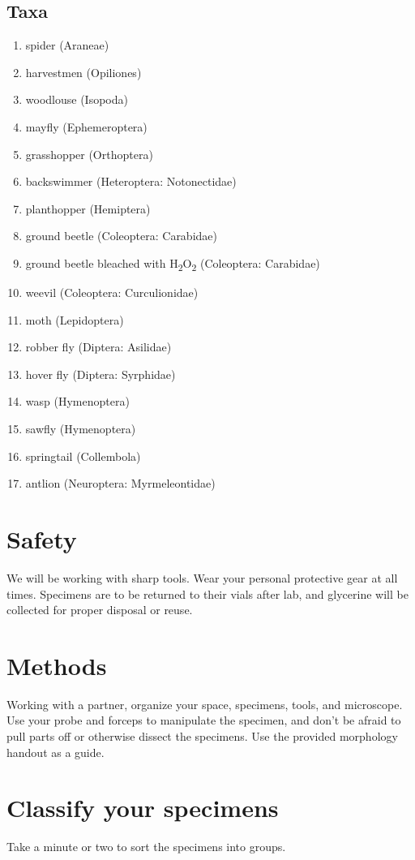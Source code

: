 \documentclass[letterpaper, 11pt]{article}
\begin{document}
\subsection*{Taxa}
\begin{enumerate}
	\item {spider (Araneae)}
	\item {harvestmen (Opiliones)}
	\item {woodlouse (Isopoda)}
	\item {mayfly (Ephemeroptera)}
	\item {grasshopper (Orthoptera)}
	\item {backswimmer (Heteroptera: Notonectidae)}
	\item {planthopper (Hemiptera)}
	\item {ground beetle (Coleoptera: Carabidae)}
	\item {ground beetle bleached with H\textsubscript{2}O\textsubscript{2} (Coleoptera: Carabidae)}
	\item {weevil (Coleoptera: Curculionidae)}
	\item {moth (Lepidoptera)}
	\item {robber fly (Diptera: Asilidae)}
	\item {hover fly (Diptera: Syrphidae)}
	\item {wasp (Hymenoptera)}
	\item {sawfly (Hymenoptera)}
	\item {springtail (Collembola)}
	\item {antlion (Neuroptera: Myrmeleontidae)}
\end{enumerate}

\section*{Safety}
We will be working with sharp tools. Wear your personal protective gear at all times. Specimens are to be returned to their vials after lab, and glycerine will be collected for proper disposal or reuse.

\section*{Methods}
Working with a partner, organize your space, specimens, tools, and microscope. Use your probe and forceps to manipulate the specimen, and don't be afraid to pull parts off or otherwise dissect the specimens. Use the provided morphology handout as a guide.

\section{Classify your specimens}
Take a minute or two to sort the specimens into groups. \\
\end{document}

